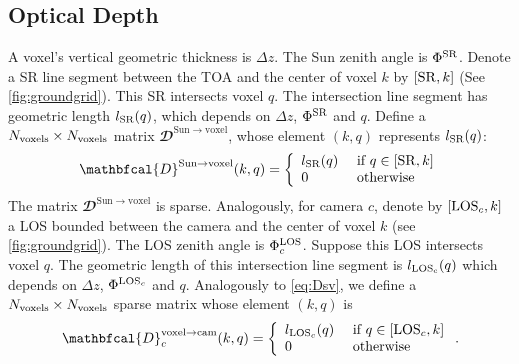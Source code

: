 \documentclass[10pt,letterpaper]{article}
\newcommand{\OpDistance}{\mathbfcal{D}}
\begin{document}

\subsection{Optical Depth}
\label{sec:optical-depth}

A voxel's vertical geometric thickness is $\Delta z$.  The Sun zenith
angle is $\Phi^{\rm SR}$. Denote a SR line segment between the TOA and
the center of voxel $k$ by $[{\rm SR},k]$ (See
\cref{fig:groundgrid}). This SR intersects voxel $q$. The intersection line segment has geometric
length $l_{\rm SR}(q)$, which depends on $\Delta z$, $\Phi^{\rm SR}$ and $q$.  Define a
$N_{\rm voxels}\times N_{\rm voxels}$ matrix $\OpDistance^{\mathrm{Sun
    \rightarrow voxel}}$, whose element $(k,q)$ represents $l_{\rm
  SR}(q)$:
\begin{equation}
  \OpDistance^{\mathrm{Sun \rightarrow voxel}}(k,q) =
  \left\{
    \begin{array}{ll}
      l_{\rm SR}(q) & \mbox{ if $q \in[{\rm SR},k]$} \\
      0  & \mbox{ otherwise}
      \label{eq:Dsv}
    \end{array}
  \right.
  \hspace{-0.05cm}
\end{equation}
The matrix $\OpDistance^{\mathrm{Sun \rightarrow voxel}}$ is
sparse.
Analogously, for camera $c$, denote by $[{\rm LOS}_c,k]$ a LOS bounded
between the camera and the center of voxel $k$ (see
\cref{fig:groundgrid}).  The LOS zenith angle is $\Phi^{\rm LOS}_c$.
Suppose this LOS intersects voxel $q$. The geometric length of this
intersection line segment is $l_{\rm LOS_c}(q)$ which depends on
$\Delta z$, $\Phi^{{\rm LOS}_c}$ and $q$.  Analogously to
\cref{eq:Dsv}, we define a $N_{\rm voxels}\times N_{\rm voxels}$
sparse matrix whose element $(k,q)$ is
\begin{equation}
  \OpDistance^{\mathrm{voxel \rightarrow cam}}_c(k,q) =
  \left\{
    \begin{array}{ll}
      l_{{\rm LOS}_c}(q) & \mbox{ if $q \in[{\rm LOS}_c,k]$} \\
      0  & \mbox{ otherwise}
      \label{eq:Dvc}
    \end{array}
  \right.
  .
  \hspace{-0.05cm}
\end{equation}
\end{document}
